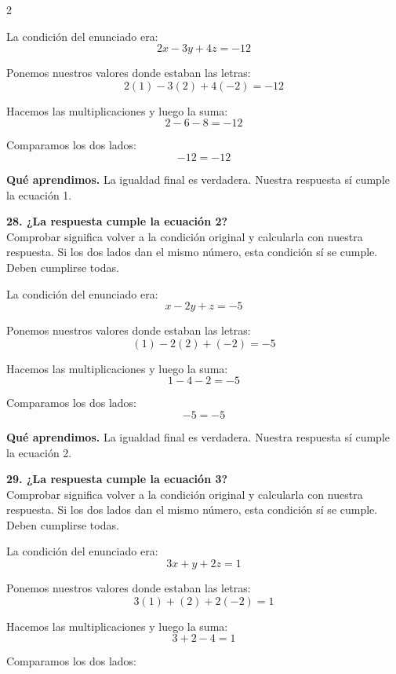 \documentclass[11pt,a4paper,landscape]{article}
\begin{document}
\begin{multicols*}{2}
\begin{minipage}{\linewidth}
\par\smallskip La condición del enunciado era:
\[2x - 3y + 4z = -12\]
\par\smallskip Ponemos nuestros valores donde estaban las letras:
\[2\left(1\right) - 3\left(2\right) + 4\left(-2\right)=-12\]
\par\smallskip Hacemos las multiplicaciones y luego la suma:
\[2 - 6 - 8=-12\]
\par\smallskip Comparamos los dos lados:
\[-12=-12\]
\par\smallskip\textbf{Qué aprendimos.} La igualdad final es verdadera. Nuestra respuesta sí cumple la ecuación 1.
\end{minipage}\par\medskip
\noindent\begin{minipage}{\linewidth}\textbf{28. ¿La respuesta cumple la ecuación 2?}\\[2pt]Comprobar significa volver a la condición original y calcularla con nuestra respuesta. Si los dos lados dan el mismo número, esta condición sí se cumple. Deben cumplirse todas.
\par\smallskip La condición del enunciado era:
\[x - 2y + z = -5\]
\par\smallskip Ponemos nuestros valores donde estaban las letras:
\[\left(1\right) - 2\left(2\right) + \left(-2\right)=-5\]
\par\smallskip Hacemos las multiplicaciones y luego la suma:
\[1 - 4 - 2=-5\]
\par\smallskip Comparamos los dos lados:
\[-5=-5\]
\par\smallskip\textbf{Qué aprendimos.} La igualdad final es verdadera. Nuestra respuesta sí cumple la ecuación 2.
\end{minipage}\par\medskip
\noindent\begin{minipage}{\linewidth}\textbf{29. ¿La respuesta cumple la ecuación 3?}\\[2pt]Comprobar significa volver a la condición original y calcularla con nuestra respuesta. Si los dos lados dan el mismo número, esta condición sí se cumple. Deben cumplirse todas.
\par\smallskip La condición del enunciado era:
\[3x + y + 2z = 1\]
\par\smallskip Ponemos nuestros valores donde estaban las letras:
\[3\left(1\right) + \left(2\right) + 2\left(-2\right)=1\]
\par\smallskip Hacemos las multiplicaciones y luego la suma:
\[3 + 2 - 4=1\]
\par\smallskip Comparamos los dos lados:

\end{minipage}
\end{multicols*}
\end{document}
